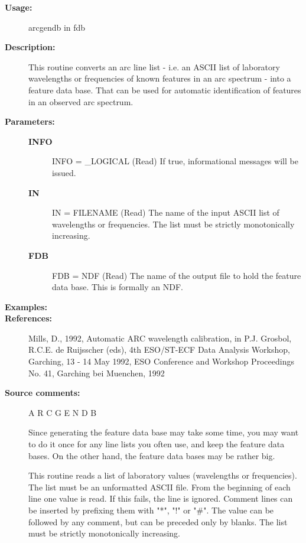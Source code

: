 \begin{description}

\item [\textbf{Usage:}]

   arcgendb in fdb


\item [\textbf{Description:}]
   This routine converts an arc line list - i.e. an ASCII list of
   laboratory wavelengths or frequencies of known features in an arc
   spectrum - into a feature data base. That can be used for
   automatic identification of features in an observed arc spectrum.


\item [\textbf{Parameters:}]
\begin{description}
\item [\textbf{INFO}]
INFO = \_LOGICAL (Read)
   If true, informational messages will be issued.
\item [\textbf{IN}]
IN = FILENAME (Read)
   The name of the input ASCII list of wavelengths or frequencies.
   The list must be strictly monotonically increasing.
\item [\textbf{FDB}]
FDB = NDF (Read)
   The name of the output file to hold the feature data base.
   This is formally an NDF.
\end{description}

\item [\textbf{Examples:}]

\item [\textbf{References:}]
   Mills, D., 1992, Automatic ARC wavelength calibration, in P.J.
   Grosbol, R.C.E. de Ruijsscher (eds), 4th ESO/ST-ECF Data Analysis
   Workshop, Garching, 13 - 14 May 1992, ESO Conference and Workshop
   Proceedings No. 41, Garching bei Muenchen, 1992


\item [\textbf{Source comments:}]
\begin{terminalv}
   A R C G E N D B

   Since generating the feature data base may take some time, you may
   want to do it once for any line lists you often use, and keep the
   feature data bases. On the other hand, the feature data bases may
   be rather big.

   This routine reads a list of laboratory values (wavelengths or
   frequencies). The list must be an unformatted ASCII file. From the
   beginning of each line one value is read. If this fails, the line
   is ignored. Comment lines can be inserted by prefixing them with
   "*", "!" or "#". The value can be followed by any comment, but can
   be preceded only by blanks. The list must be strictly
   monotonically increasing.


\end{terminalv}
\end{description}
